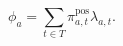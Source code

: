 \begin{equation}
  \phi_{a} = \sum_{t \in T} \pi_{a, t}^{\text{pos}} \lambda_{a,t}.
  \label{eqn:phi-icu-calc}
\end{equation}